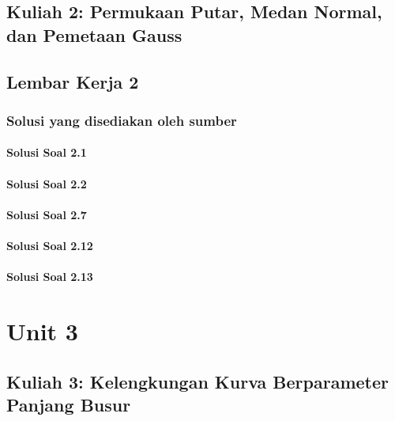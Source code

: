 \documentclass[11pt,a4paper,oneside]{book}
\begin{document}
\chapter[Kuliah 2]{Kuliah 2: Permukaan Putar, Medan Normal, dan Pemetaan Gauss}


\chapter{Lembar Kerja 2}


\section*{Solusi yang disediakan oleh sumber}
\subsection*{Solusi Soal 2.1}

\subsection*{Solusi Soal 2.2}

\subsection*{Solusi Soal 2.7}
\begingroup\scriptsize

\endgroup
\subsection*{Solusi Soal 2.12}
\begingroup\small

\endgroup
\subsection*{Solusi Soal 2.13}


\part{Unit 3}
\chapter[Kuliah 3]{Kuliah 3: Kelengkungan Kurva Berparameter Panjang Busur}

\end{document}
